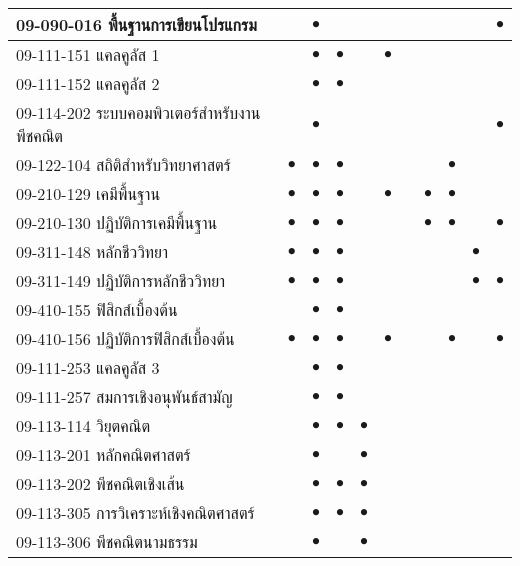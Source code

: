 \begin{longtable}{|>{\raggedright}p{}|c|c|c|c|c|c|c|c|c|c|}
	09-090-016 พื้นฐานการเขียนโปรแกรม&&{\Large$\bullet$}&&&&&&&&{\Large$\bullet$}\\
	\hline
	09-111-151 แคลคูลัส 1&&{\Large$\bullet$}&{\Large$\bullet$}&&{\Large$\bullet$}&&&&&\\
	\hline
	09-111-152 แคลคูลัส 2
	&&{\Large$\bullet$}&{\Large$\bullet$}&&&&&&&\\
	\hline
	09-114-202 ระบบคอมพิวเตอร์สำหรับงานพีชคณิต&&{\Large$\bullet$}&&&&&&&&{\Large$\bullet$}\\
	\hline
	09-122-104 สถิติสำหรับวิทยาศาสตร์&{\Large$\bullet$}&{\Large$\bullet$}&{\Large$\bullet$}&&&&&{\Large$\bullet$}&&\\
	\hline
	09-210-129 เคมีพื้นฐาน&{\Large$\bullet$}&{\Large$\bullet$}&{\Large$\bullet$}&&{\Large$\bullet$}&&{\Large$\bullet$}&{\Large$\bullet$}&&\\
	\hline
	09-210-130 ปฏิบัติการเคมีพื้นฐาน&{\Large$\bullet$}&{\Large$\bullet$}&{\Large$\bullet$}&&&&{\Large$\bullet$}&{\Large$\bullet$}&&{\Large$\bullet$}\\
	\hline
	09-311-148 หลักชีววิทยา&{\Large$\bullet$}&{\Large$\bullet$}&{\Large$\bullet$}&&&&&&{\Large$\bullet$}&\\
	\hline
	09-311-149 ปฏิบัติการหลักชีววิทยา&{\Large$\bullet$}&{\Large$\bullet$}&{\Large$\bullet$}&&&&&&{\Large$\bullet$}&{\Large$\bullet$}\\
	\hline
	09-410-155 ฟิสิกส์เบื้องต้น&&{\Large$\bullet$}&{\Large$\bullet$}&&&&&&&\\
	\hline
	09-410-156 ปฏิบัติการฟิสิกส์เบื้องต้น&{\Large$\bullet$}&{\Large$\bullet$}&{\Large$\bullet$}&&{\Large$\bullet$}&&&{\Large$\bullet$}&&{\Large$\bullet$}\\
	\hline
	09-111-253 แคลคูลัส 3&&{\Large$\bullet$}&{\Large$\bullet$}&&&&&&&\\
	\hline
	09-111-257 สมการเชิงอนุพันธ์สามัญ&&{\Large$\bullet$}&{\Large$\bullet$}&&&&&&&\\
	\hline
	09-113-114 วิยุตคณิต&&{\Large$\bullet$}&{\Large$\bullet$}&{\Large$\bullet$}&&&&&&\\
	\hline
	09-113-201 หลักคณิตศาสตร์&&{\Large$\bullet$}&&{\Large$\bullet$}&&&&&&\\
	\hline
	09-113-202 พีชคณิตเชิงเส้น&&{\Large$\bullet$}&{\Large$\bullet$}&{\Large$\bullet$}&&&&&&\\
	\hline
	09-113-305 การวิเคราะห์เชิงคณิตศาสตร์&&{\Large$\bullet$}&{\Large$\bullet$}&{\Large$\bullet$}&&&&&&\\
	\hline
	09-113-306 พีชคณิตนามธรรม&&{\Large$\bullet$}&&{\Large$\bullet$}&&&&&&\\

\end{longtable}
